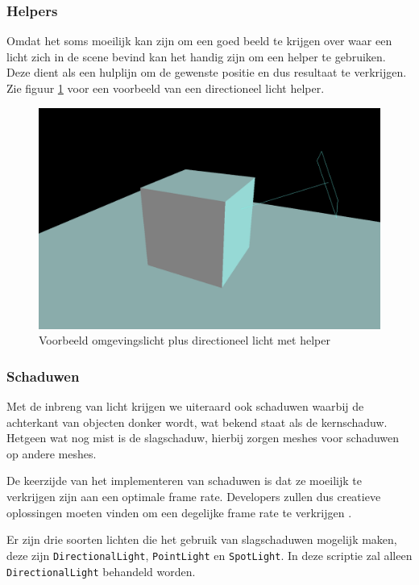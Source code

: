 \subsubsection{Helpers}

Omdat het soms moeilijk kan zijn om een goed beeld te krijgen over waar een licht zich in de scene bevind kan het handig zijn om een helper te gebruiken. Deze dient als een hulplijn om de gewenste positie en dus resultaat te verkrijgen. Zie figuur \ref{fig:directionalLightHelper} voor een voorbeeld van een directioneel licht helper.

\begin{figure}[h]
	\centering
	\includegraphics[width=.7\linewidth]{graphics/directionalLightHelper}
	\caption[Voorbeeld omgevingslicht plus directioneel licht met helper]{Voorbeeld omgevingslicht plus directioneel licht met helper}
	\label{fig:directionalLightHelper}
\end{figure}

\subsubsection{Schaduwen}

Met de inbreng van licht krijgen we uiteraard ook schaduwen waarbij de achterkant van objecten donker wordt, wat bekend staat als de kernschaduw. Hetgeen wat nog mist is de slagschaduw, hierbij zorgen meshes voor schaduwen op andere meshes.

De keerzijde van het implementeren van schaduwen is dat ze moeilijk te verkrijgen zijn aan een optimale frame rate. Developers zullen dus creatieve oplossingen moeten vinden om een degelijke frame rate te verkrijgen \autocite{Simon2023}.

Er zijn drie soorten lichten die het gebruik van slagschaduwen mogelijk maken, deze zijn \texttt{DirectionalLight}, \texttt{PointLight} en \texttt{SpotLight}. In deze scriptie zal alleen \texttt{DirectionalLight} behandeld worden.

